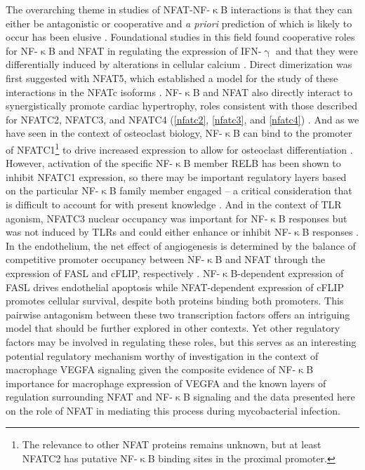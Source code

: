 The overarching theme in studies of NFAT\hyp{}NF\hyp{}$\upkappa$B interactions is that they can either be antagonistic or cooperative and \textit{a priori} prediction of which is likely to occur has been elusive \citep{Khalaf2013, Fisher2006}. Foundational studies in this field found cooperative roles for NF\hyp{}$\upkappa$B and NFAT in regulating the expression of IFN\hyp{}$\upgamma$ \citep{Sica1997} and that they were differentially induced by alterations in cellular calcium \citep{Dolmetsch1997}. Direct dimerization was first suggested with NFAT5, which established a model for the study of these interactions in the NFATc isoforms \citep{LopezRodriguez2001}. NF\hyp{}$\upkappa$B and NFAT also directly interact to synergistically promote cardiac hypertrophy, roles consistent with those described for NFATC2, NFATC3, and NFATC4 (\autoref{nfatc2}, \autoref{nfatc3}, and \autoref{nfatc4}) \citep{Liu2012}. And as we have seen in the context of osteoclast biology, NF\hyp{}$\upkappa$B can bind to the promoter of NFATC1\footnote{The relevance to other NFAT proteins remains unknown, but at least NFATC2 has putative NF\hyp{}$\upkappa$B binding sites in the proximal promoter.} to drive increased expression to allow for osteoclast differentiation \citep{Asagiri2005}. However, activation of the specific NF\hyp{}$\upkappa$B member RELB has been shown to inhibit NFATC1 expression, so there may be important regulatory layers based on the particular NF\hyp{}$\upkappa$B family member engaged -- a critical consideration that is difficult to account for with present knowledge \citep{Zhao2015}. And in the context of TLR agonism, NFATC3 nuclear occupancy was important for NF\hyp{}$\upkappa$B responses but was not induced by TLRs and could either enhance or inhibit NF\hyp{}$\upkappa$B responses \citep{Minematsu2011, Conboy1999}. In the endothelium, the net effect of angiogenesis is determined by the balance of competitive promoter occupancy between NF\hyp{}$\upkappa$B and NFAT through the expression of FASL and cFLIP, respectively \citep{Aurora2010}. NF\hyp{}$\upkappa$B\hyp{}dependent expression of FASL drives endothelial apoptosis while NFAT\hyp{}dependent expression of cFLIP promotes cellular survival, despite both proteins binding both promoters. This pairwise antagonism between these two transcription factors offers an intriguing model that should be further explored in other contexts. Yet other regulatory factors may be involved in regulating these roles, but this serves as an interesting potential regulatory mechanism worthy of investigation in the context of macrophage VEGFA signaling given the composite evidence of NF\hyp{}$\upkappa$B importance for macrophage expression of VEGFA and the known layers of regulation surrounding NFAT and NF\hyp{}$\upkappa$B signaling and the data presented here on the role of NFAT in mediating this process during mycobacterial infection.

